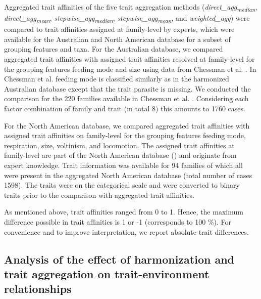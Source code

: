 \documentclass{article}
\begin{document}
Aggregated trait affinities of the five trait aggregation methods (\textit{direct\_agg\textsubscript{median}}, \textit{direct\_agg\textsubscript{mean}}, \textit{stepwise\_agg\textsubscript{median}}, \textit{stepwise\_agg\textsubscript{mean}}, and \textit{weighted\_agg}) were compared to trait affinities assigned at family-level by experts, which were available for the Australian and North American database for a subset of grouping features and taxa. For the Australian database, we compared aggregated trait affinities with assigned trait affinities resolved at family-level for the grouping features feeding mode and size using data from Chessman et al. \cite{chessman_dissolved-oxygen_2018}. In Chessman et al. \cite{chessman_dissolved-oxygen_2018} feeding mode is classified similarly as in the harmonized Australian database except that the trait parasite is missing. We conducted the comparison for the 220 families available in Chessman et al. \cite{chessman_dissolved-oxygen_2018}. Considering each factor combination of family and trait (in total 8) this amounts to 1760 cases.

For the North American database, we compared aggregated trait affinities with assigned trait affinities on family-level for the grouping features feeding mode, respiration, size, voltinism, and locomotion. The assigned trait affinities at family-level are part of the North American database (\cite{twardochleb_trait_data_2020}) and originate from expert knowledge. Trait information was available for 94 families of which all were present in the aggregated North American database (total number of cases 1598). The traits were on the categorical scale and were converted to binary traits prior to the comparison with aggregated trait affinities.

As mentioned above, trait affinities ranged from 0 to 1. Hence, the maximum difference possible in trait affinities is 1 or -1 (corresponds to 100 \%). For convenience and to improve interpretation, we report absolute trait differences.


\subsection*{Analysis of the effect of harmonization and trait aggregation on trait-environment relationships}
\end{document}
